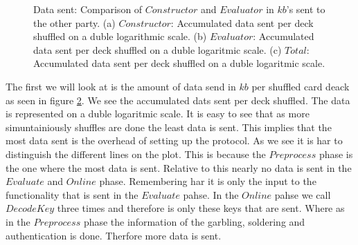 \documentclass[twoside,11pt,openright]{report}
\begin{document}
\begin{figure}
    \begin{subfigure}{\textwidth}
        \centering
        \caption{}
        \label{fig:total_kb_plot}
    \end{subfigure}

    \caption{Data sent: Comparison of $Constructor$ and $Evaluator$ in $kb$'s sent to the other party. (a) $Constructor$: Accumulated data sent per deck shuffled on a duble logarithmic scale. (b) $Evaluator$: Accumulated data sent per deck shuffled on a duble logaritmic scale. (c) $Total$: Accumulated data sent per deck shuffled on a duble logaritmic scale.}
    \label{fig:mesurement_kb}
\end{figure}

The first we will look at is the amount of data send in $kb$ per shuffled card deack as seen in figure \ref{fig:mesurement_kb}. We see the accumulated dats sent per deck shuffled. The data is represented on a duble logaritmic scale. It is easy to see that as more simuntainiously shuffles are done the least data is sent. This implies that the most data sent is the overhead of setting up the protocol. As we see it is har to distinguish the different lines on the plot. This is because the $Preprocess$ phase is the one where the most data is sent. Relative to this nearly no data is sent in the $Evaluate$ and $Online$ phase. Remembering har it is only the input to the functionality that is sent in the $Evaluate$ pahse. In the $Online$ pahse we call $DecodeKey$ three times and therefore is only these keys that are sent. Where as in the $Preprocess$ phase the information of the garbling, soldering and authentication is done. Therfore more data is sent.
\end{document}

